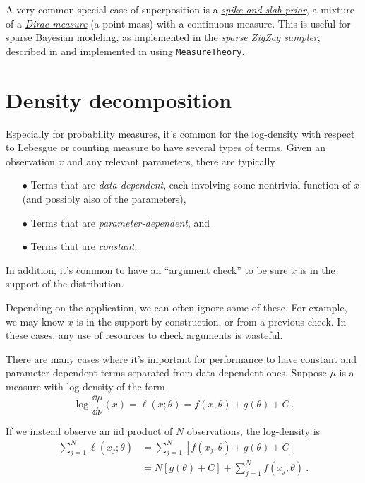 \documentclass{juliacon}
\begin{document}
A very common special case of superposition is a \href{https://en.wikipedia.org/wiki/Spike-and-slab_regression}{\emph{spike and slab prior}}, a mixture of a \href{https://en.wikipedia.org/wiki/Dirac_measure}{\emph{Dirac measure}} (a point mass) with a continuous measure. 
This is useful for sparse Bayesian modeling, as implemented in the \emph{sparse ZigZag sampler}, described in \cite{arxiv2103.08478} and implemented in \cite{https://doi.org/10.5281/zenodo.3931118} using \verb|MeasureTheory|.

\section{Density decomposition}

Especially for probability measures, it's common for the log-density with respect to Lebesgue or counting measure to have several types of terms. Given an observation $x$ and any relevant parameters, there are typically 
\begin{itemize}
    \item[$\bullet\!$] Terms that are \emph{data-dependent}, each involving some nontrivial function of $x$ (and possibly also of the parameters),
    \item[$\bullet\!$] Terms that are \emph{parameter-dependent}, and
    \item[$\bullet\!$] Terms that are \emph{constant}.
\end{itemize}

In addition, it's common to have an ``argument check'' to be sure $x$ is in the support of the distribution.

Depending on the application, we can often ignore some of these. For example, we may know $x$ is in the support by construction, or from a previous check. In these cases, any use of resources to check arguments is wasteful.

There are many cases where it's important for performance to have constant and parameter-dependent terms separated from data-dependent ones. Suppose $\mu$ is a measure with log-density of the form
\[
\log \frac{\dd\mu}{\dd\nu}(x) = \ell(x; \theta) = f(x,\theta) + g(\theta) + C\ .
\]

If we instead observe an iid product of $N$ observations, the log-density is
\[
\begin{aligned}
\sum_{j=1}^N\ell(x_j; \theta) 
    &= \sum_{j=1}^N \left[ f(x_j,\theta) + g(\theta) + C\right] \\
    &= N [g(\theta) + C] + \sum_{j=1}^N  f(x_j,\theta)\ .
\end{aligned}
\]
\end{document}
